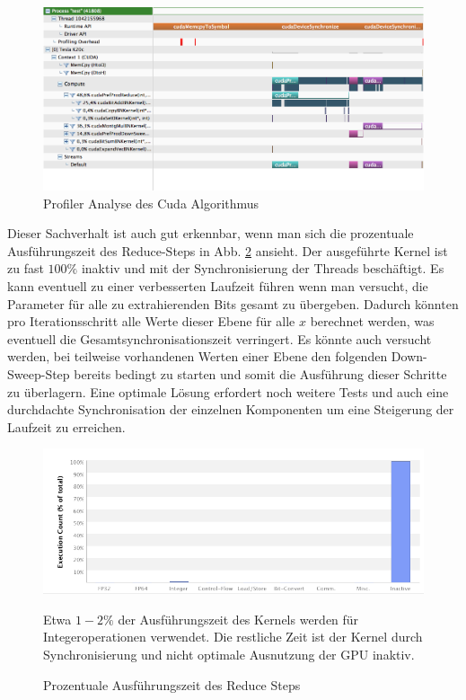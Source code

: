 {\begin{figure}
\centering
\includegraphics[scale=0.45]{Kapitel/Implementierung/cuda_timeline.png}
\caption{Profiler Analyse des Cuda Algorithmus}
\label{figure:timeline}
\end{figure}

Dieser Sachverhalt ist auch gut erkennbar, wenn man sich die prozentuale Ausführungszeit des Reduce-Steps in Abb. \ref{figure:exec_count} ansieht. Der ausgeführte Kernel ist zu fast $100\%$ inaktiv und mit der Synchronisierung der Threads beschäftigt. Es kann eventuell zu einer verbesserten Laufzeit führen wenn man versucht, die Parameter für alle zu extrahierenden Bits gesamt zu übergeben. Dadurch könnten pro Iterationsschritt alle Werte dieser Ebene für alle $x$ berechnet werden, was eventuell die Gesamtsynchronisationszeit verringert. Es könnte auch versucht werden, bei teilweise vorhandenen Werten einer Ebene den folgenden Down-Sweep-Step bereits bedingt zu starten und somit die Ausführung dieser Schritte zu überlagern. Eine optimale Lösung erfordert noch weitere Tests und auch eine durchdachte Synchronisation der einzelnen Komponenten um eine Steigerung der Laufzeit zu erreichen.

\begin{figure}
\centering
\includegraphics[scale=0.5]{Kapitel/Implementierung/cudaPrefProdReduce_execution_count.png}
\caption{Prozentuale Ausführungszeit des Reduce Steps}
\label{figure:exec_count}
Etwa $1-2\%$ der Ausführungszeit des Kernels werden für Integeroperationen verwendet. Die restliche Zeit ist der Kernel durch Synchronisierung und nicht optimale Ausnutzung der GPU inaktiv.
\end{figure}

}

